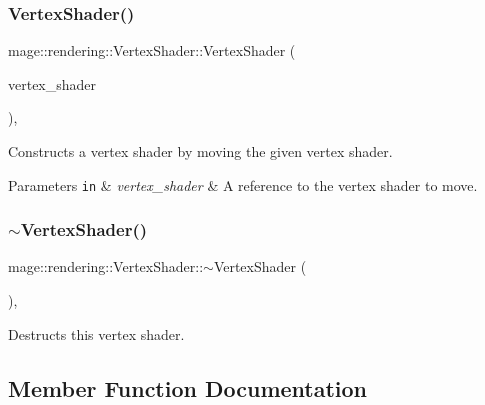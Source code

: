 \subsubsection{\texorpdfstring{Vertex\+Shader()}{VertexShader()}\hspace{0.1cm}{\footnotesize\ttfamily [3/3]}}
{\footnotesize\ttfamily mage\+::rendering\+::\+Vertex\+Shader\+::\+Vertex\+Shader (\begin{DoxyParamCaption}\item[{\mbox{\hyperlink{classmage_1_1rendering_1_1_vertex_shader}{Vertex\+Shader}} \&\&}]{vertex\+\_\+shader }\end{DoxyParamCaption})\hspace{0.3cm}{\ttfamily [default]}, {\ttfamily [noexcept]}}

Constructs a vertex shader by moving the given vertex shader.


\begin{DoxyParams}[1]{Parameters}
\mbox{\tt in}  & {\em vertex\+\_\+shader} & A reference to the vertex shader to move. \\
\hline
\end{DoxyParams}
\mbox{\label{classmage_1_1rendering_1_1_vertex_shader_a4c57483ff1995a235472787b72ad4577}} 
\subsubsection{\texorpdfstring{$\sim$\+Vertex\+Shader()}{~VertexShader()}}
{\footnotesize\ttfamily mage\+::rendering\+::\+Vertex\+Shader\+::$\sim$\+Vertex\+Shader (\begin{DoxyParamCaption}{ }\end{DoxyParamCaption})\hspace{0.3cm}{\ttfamily [virtual]}, {\ttfamily [default]}}

Destructs this vertex shader. 

\subsection{Member Function Documentation}
\mbox{\label{classmage_1_1rendering_1_1_vertex_shader_aa7090e902c68760713513fbfa33a1553}} 
